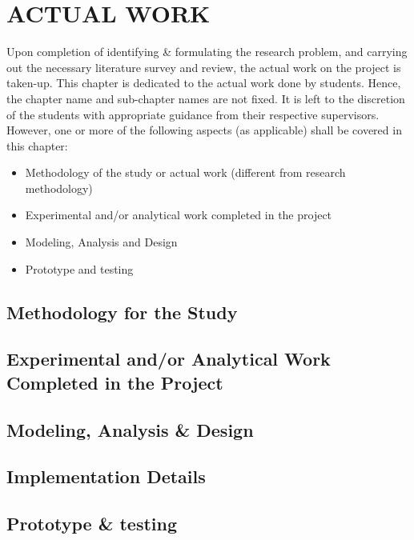 \chapter{ACTUAL WORK} %
\label{ChapterActualWork} %


Upon completion of identifying \& formulating the research problem, and carrying out the necessary literature survey and review, the actual work on the project is taken-up. This chapter is dedicated to the actual work done by students. Hence, the chapter name and sub-chapter names are not fixed. It is left to the discretion of the students with appropriate guidance from their respective supervisors. However, one or more of the following aspects (as applicable) shall be covered in this chapter:
\begin{itemize}
	\item Methodology of the study or actual work (different from research methodology)
	\item Experimental and/or analytical work completed in the project
	\item Modeling, Analysis and Design
	\item Prototype and testing
\end{itemize}



\section{Methodology for the Study}

\section{Experimental and/or Analytical Work Completed in the Project}

\section{Modeling, Analysis \& Design}

\section{Implementation Details}

\section{Prototype \& testing}

